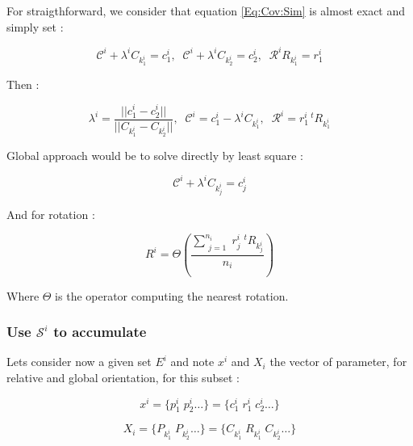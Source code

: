 For straigthforward, we consider that equation \ref{Eq:Cov:Sim} is almost exact and simply set :

\begin{equation}
  \mathcal{C}^i + \lambda^i C_{k^i_1}   = c^i_1 , \;\;
  \mathcal{C}^i + \lambda^i C_{k^i_2}   = c^i_2 , \;\;
  \mathcal{R}^i R_{k^i_1} = r^i_1
\end{equation}

Then :

\begin{equation}
    \lambda^i = \frac{||c^i_1-c^i_2||}{||C_{k^i_1} - C_{k^i_2}||} , \;\;
     \mathcal{C}^i = c^i_1 -\lambda^i C_{k^i_1} , \;\;
     \mathcal{R}^i  = r^i_1   \,  ^t R_{k^i_1}
     \label{StrLess:Simple:EstimSim}
\end{equation}

Global approach would be to solve directly by least square :

\begin{equation}
   \mathcal{C}^i + \lambda^i C_{k^i_j}   = c^i_j 
    \label{StrLess:Global:EstimLine}
\end{equation}

And for rotation :

\begin{equation}
    R^i  = \Theta(   \frac{\sum \limits_{\substack{j=1 }}^{n_i}  r^i_j   \;  ^t R_{k^i_j}}{n_i})
    \label{StrLess:Global:EstimRot}
\end{equation}

Where $\Theta$ is the operator computing the nearest rotation.


\subsubsection{Use $ \mathcal{S}^i$ to accumulate}

Lets  consider now a given set $E^i$ and note $x^i $ and $X_i$ the vector of parameter, 
for relative and global orientation, for this subset  :

\begin{equation}
    x^i = \{p^i_1 \; p^i_2  \dots\} = \{c^i_1 \;  r^i_1 \; c^i_2  \dots \}
\end{equation}

\begin{equation}
    X_i = \{P_{k^i_1} \; P_{k^i_2}  \dots\} = \{C_{k^i_1} \;  R_{k^i_1} \; C_{k^i_2}  \dots \}
\end{equation}

